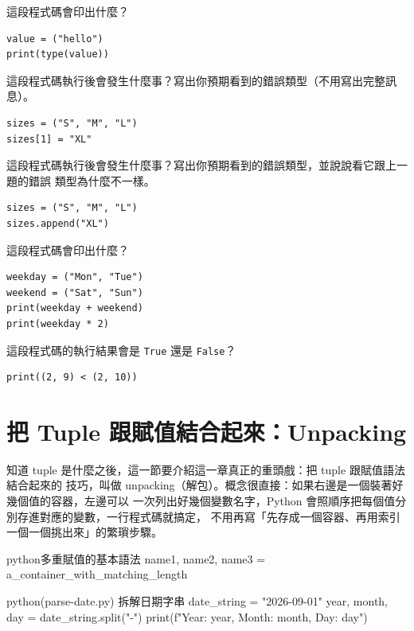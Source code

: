 \begin{drills}[label=drills:tuple-basics]
\item 這段程式碼會印出什麼？
\begin{verbatim}
value = ("hello")
print(type(value))
\end{verbatim}
\item 這段程式碼執行後會發生什麼事？寫出你預期看到的錯誤類型（不用寫出完整訊息）。
\begin{verbatim}
sizes = ("S", "M", "L")
sizes[1] = "XL"
\end{verbatim}
\item 這段程式碼執行後會發生什麼事？寫出你預期看到的錯誤類型，並說說看它跟上一題的錯誤
類型為什麼不一樣。
\begin{verbatim}
sizes = ("S", "M", "L")
sizes.append("XL")
\end{verbatim}
\item 這段程式碼會印出什麼？
\begin{verbatim}
weekday = ("Mon", "Tue")
weekend = ("Sat", "Sun")
print(weekday + weekend)
print(weekday * 2)
\end{verbatim}
\item 這段程式碼的執行結果會是 \texttt{True} 還是 \texttt{False}？
\begin{verbatim}
print((2, 9) < (2, 10))
\end{verbatim}
\end{drills}

\section{把 Tuple 跟賦值結合起來：Unpacking}
\label{sec:tuple-unpacking}

知道 tuple 是什麼之後，這一節要介紹這一章真正的重頭戲：把 tuple 跟賦值語法結合起來的
技巧，叫做 unpacking（解包）。概念很直接：如果右邊是一個裝著好幾個值的容器，左邊可以
一次列出好幾個變數名字，Python 會照順序把每個值分別存進對應的變數，一行程式碼就搞定，
不用再寫「先存成一個容器、再用索引一個一個挑出來」的繁瑣步驟。

\begin{code}{python}{多重賦值的基本語法}
name1, name2, name3 = a_container_with_matching_length
\end{code}

\begin{example}{python}{(parse-date.py) 拆解日期字串}
date_string = "2026-09-01"
year, month, day = date_string.split("-")
print(f"Year: {year}, Month: {month}, Day: {day}")
\end{example}

